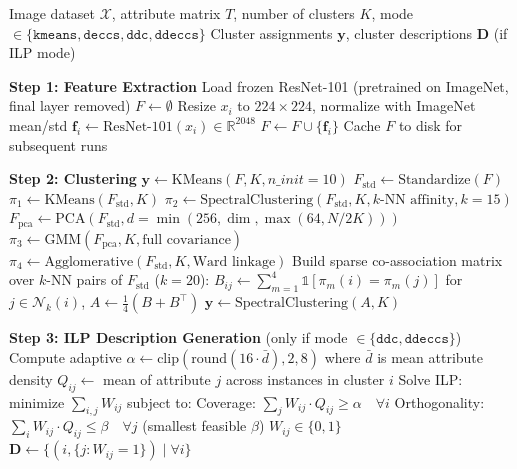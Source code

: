 \begin{algorithm}[H]
\caption{DDECCS Pipeline}
\label{alg:ddeccs}
\begin{algorithmic}[1]
    \Require Image dataset $\mathcal{X}$, attribute matrix $T$, number of clusters $K$, mode $\in \{\texttt{kmeans}, \texttt{deccs}, \texttt{ddc}, \texttt{ddeccs}\}$
    \Ensure Cluster assignments $\mathbf{y}$, cluster descriptions $\mathbf{D}$ (if ILP mode)

    \State \textbf{Step 1: Feature Extraction}
    \State Load frozen ResNet-101 (pretrained on ImageNet, final layer removed)
    \State $F \gets \emptyset$
        \State Resize $x_i$ to $224 \times 224$, normalize with ImageNet mean/std
        \State $\mathbf{f}_i \gets \text{ResNet-101}(x_i) \in \mathbb{R}^{2048}$ 
        \State $F \gets F \cup \{\mathbf{f}_i\}$
    \EndFor
    \State Cache $F$ to disk for subsequent runs

    \Statex
    \State \textbf{Step 2: Clustering}
        \State $\mathbf{y} \gets \text{KMeans}(F, K, n\_init = 10)$ 
    \State $F_{\text{std}} \gets \text{Standardize}(F)$ 
    \State $\pi_1 \gets \text{KMeans}(F_{\text{std}}, K)$
    \State $\pi_2 \gets \text{SpectralClustering}(F_{\text{std}}, K, k\text{-NN affinity}, k=15)$
    \State $F_{\text{pca}} \gets \text{PCA}(F_{\text{std}}, d=\min(256, \dim, \max(64, N/2K)))$ 
    \State $\pi_3 \gets \text{GMM}(F_{\text{pca}}, K, \text{full covariance})$
    \State $\pi_4 \gets \text{Agglomerative}(F_{\text{std}}, K, \text{Ward linkage})$
    \State Build sparse co-association matrix over $k$-NN pairs of $F_{\text{std}}$ ($k = 20$):
    \State \quad $B_{ij} \gets \sum_{m=1}^{4} \mathbb{1}[\pi_m(i) = \pi_m(j)]$ for $j \in \mathcal{N}_k(i)$, \quad $A \gets \frac{1}{4}(B + B^{\top})$
    \State $\mathbf{y} \gets \text{SpectralClustering}(A, K)$
    \EndIf

    \Statex
    \State \textbf{Step 3: ILP Description Generation} (only if mode $\in \{\texttt{ddc}, \texttt{ddeccs}\}$)
    \State Compute adaptive $\alpha \gets \text{clip}(\text{round}(16 \cdot \bar{d}), 2, 8)$ where $\bar{d}$ is mean attribute density
            \State $Q_{ij} \gets$ mean of attribute $j$ across instances in cluster $i$
        \EndFor
    \EndFor
    \State Solve ILP: minimize $\sum_{i,j} W_{ij}$ subject to:
    \State \quad Coverage: $\sum_j W_{ij} \cdot Q_{ij} \geq \alpha \quad \forall i$
    \State \quad Orthogonality: $\sum_i W_{ij} \cdot Q_{ij} \leq \beta \quad \forall j$ (smallest feasible $\beta$)
    \State \quad $W_{ij} \in \{0, 1\}$
    \State $\mathbf{D} \gets \{(i, \{j : W_{ij} = 1\}) \mid \forall i\}$


\end{algorithmic}
\end{algorithm}
